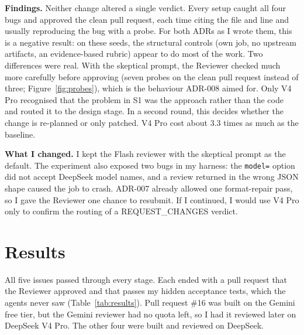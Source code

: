 \documentclass[10pt,a4paper]{article}
\newcommand{\code}[1]{\texttt{#1}}
\begin{document}
\textbf{Findings.} Neither change altered a single verdict. Every setup caught all four bugs and
approved the clean pull request, each time citing the file and line and usually reproducing the bug
with a probe. For both ADRs as I wrote them, this is a negative result: on these seeds, the structural
controls (own job, no upstream artifacts, an evidence-based rubric) appear to do most of the work. Two
differences were real. With the skeptical prompt, the Reviewer checked much more carefully before
approving (seven probes on the clean pull request instead of three; Figure~\ref{fig:probes}), which is
the behaviour ADR-008 aimed for. Only V4 Pro recognised that the problem in S1 was the approach rather
than the code and routed it to the design stage. In a second round, this decides whether the change is
re-planned or only patched. V4 Pro cost about 3.3 times as much as the baseline.

\textbf{What I changed.} I kept the Flash reviewer with the skeptical prompt as the default. The
experiment also exposed two bugs in my harness: the \code{model=} option did not accept DeepSeek model names,
and a review returned in the wrong JSON shape caused the job to crash. ADR-007 already allowed one
format-repair pass, so I gave the Reviewer one chance to resubmit. If I continued, I would use V4 Pro
only to confirm the routing of a REQUEST\_CHANGES verdict.

\section{Results}

All five issues passed through every stage. Each ended with a pull request that the Reviewer approved
and that passes my hidden acceptance tests, which the agents never saw (Table~\ref{tab:results}).
Pull request \#16 was built on the Gemini free tier, but the Gemini reviewer had no quota left, so I
had it reviewed later on DeepSeek V4 Pro. The other four were built and reviewed on DeepSeek.
\end{document}

